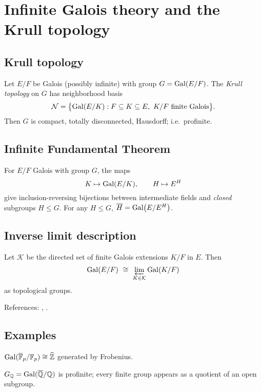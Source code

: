 \section{Infinite Galois theory and the Krull topology}\label{sec:infinite-galois}

\subsection{Krull topology}
\begin{definition}
Let $E/F$ be Galois (possibly infinite) with group $G=\operatorname{Gal}(E/F)$. The \emph{Krull topology} on $G$ has neighborhood basis
\[
\mathcal{N}=\bigl\{\operatorname{Gal}(E/K): F\subseteq K\subseteq E,\ K/F\ \text{finite Galois}\bigr\}.
\]
Then $G$ is compact, totally disconnected, Hausdorff; i.e.\ profinite.
\end{definition}

\subsection{Infinite Fundamental Theorem}
\begin{theorem}
For $E/F$ Galois with group $G$, the maps
\[
K\mapsto \operatorname{Gal}(E/K),\qquad H\mapsto E^{H}
\]
give inclusion-reversing bijections between intermediate fields and \emph{closed} subgroups $H\le G$. For any $H\le G$, $\overline{H}=\operatorname{Gal}\bigl(E/E^{H}\bigr)$.
\end{theorem}

\subsection{Inverse limit description}
\begin{theorem}
Let $\mathcal{K}$ be the directed set of finite Galois extensions $K/F$ in $E$. Then
\[
\Gal(E/F)\ \cong\ \varprojlim_{K\in\mathcal{K}} \Gal(K/F)
\]
as topological groups.
\end{theorem}
References: \cite[Ch.~VIII]{Lang}, \cite[Ch.~I]{Neukirch}.

\subsection{Examples}
\begin{example}
$\operatorname{Gal}(\overline{\mathbb{F}}_p/\mathbb{F}_p)\cong\widehat{\mathbb{Z}}$ generated by Frobenius.
\end{example}
\begin{example}
$G_{\mathbb{Q}}=\operatorname{Gal}(\overline{\mathbb{Q}}/\mathbb{Q})$ is profinite; every finite group appears as a quotient of an open subgroup.
\end{example}
